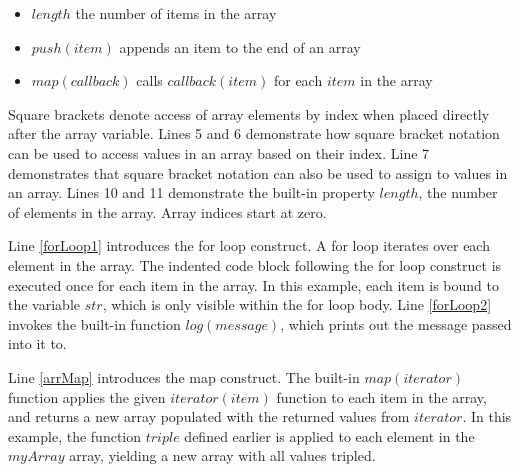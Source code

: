 \begin{itemize}
\item $length$ the number of items in the array
\item $push(item)$ appends an item to the end of an array
\item $map(callback)$ calls $callback(item)$ for each $item$ in the array
\end{itemize}

Square brackets denote access of array elements by index when placed directly after the array variable. Lines 5 and 6 demonstrate how square bracket notation can be used to access values in an array based on their index. Line 7 demonstrates that square bracket notation can also be used to assign to values in an array. Lines 10 and 11 demonstrate the built-in property $length$, the number of elements in the array. Array indices start at zero. 

Line \ref{forLoop1} introduces the for loop construct. A for loop iterates over each element in the array. The indented code block following the for loop construct is executed once for each item in the array. In this example, each item is bound to the variable $str$, which is only visible within the for loop body. Line \ref{forLoop2} invokes the built-in function $log(message)$, which prints out the message passed into it to.

Line \ref{arrMap} introduces the map construct. The built-in $map(iterator)$ function applies the given $iterator(item)$ function to each item in the array, and returns a new array populated with the returned values from $iterator$. In this example, the function $triple$ defined earlier is applied to each element in the $myArray$ array, yielding a new array with all values tripled.

\label{objects}


